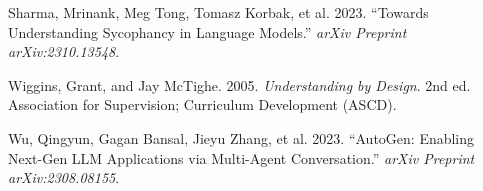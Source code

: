 \documentclass[
  11pt,
  letterpaper,
]{article}
\newlength{\cslhangindent}
\newenvironment{CSLReferences}[2] %
 {\begin{list}{}{%
  \setlength{\itemindent}{0pt}
  \setlength{\leftmargin}{0pt}
  \setlength{\parsep}{0pt}
  \ifodd #1
   \setlength{\leftmargin}{\cslhangindent}
   \setlength{\itemindent}{-1\cslhangindent}
  \fi
  \setlength{\itemsep}{#2\baselineskip}}}
 {\end{list}}
\begin{document}
\begin{CSLReferences}{1}{1}
{Sharma, Mrinank, Meg Tong, Tomasz Korbak, et al.} 2023. {``Towards
Understanding Sycophancy in Language Models.''} \emph{arXiv Preprint
arXiv:2310.13548}.

Wiggins, Grant, and Jay McTighe. 2005. \emph{Understanding by Design}.
2nd ed. Association for Supervision; Curriculum Development (ASCD).

Wu, Qingyun, Gagan Bansal, Jieyu Zhang, et al. 2023. {``AutoGen:
Enabling Next-Gen LLM Applications via Multi-Agent Conversation.''}
\emph{arXiv Preprint arXiv:2308.08155}.

\end{CSLReferences}
\end{document}
